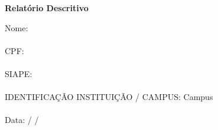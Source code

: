 \label{relatorio-descritivo}

\begin{center}
\textbf{{\Large Relatório Descritivo}}
\end{center}
%
{\Large
Nome: \the\nomeservidor
\\
\vspace{0.6in}
\\
CPF: \the\cpf
\\
\vspace{0.6in}
\\
SIAPE: \the\siape
\\
\vspace{0.6in}
\\
IDENTIFICAÇÃO INSTITUIÇÃO / CAMPUS: \the\instituicao \space Campus \the\campus
\\
\vspace{0.6in}
\\
Data: \underline{\hspace{0.3in}} / \underline{\hspace{0.3in}} / \underline{\hspace{0.3in}}
}